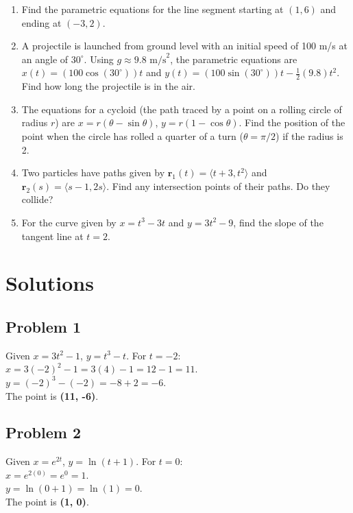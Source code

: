 \documentclass{article}
\begin{document}
\begin{enumerate}
    \item Find the parametric equations for the line segment starting at $(1, 6)$ and ending at $(-3, 2)$.
    \item A projectile is launched from ground level with an initial speed of 100 m/s at an angle of $30^\circ$. Using $g \approx 9.8 \text{ m/s}^2$, the parametric equations are $x(t) = (100\cos(30^\circ))t$ and $y(t) = (100\sin(30^\circ))t - \frac{1}{2}(9.8)t^2$. Find how long the projectile is in the air.
    \item The equations for a cycloid (the path traced by a point on a rolling circle of radius $r$) are $x = r(\theta - \sin\theta)$, $y = r(1-\cos\theta)$. Find the position of the point when the circle has rolled a quarter of a turn ($\theta = \pi/2$) if the radius is 2.

    \item Two particles have paths given by $\mathbf{r}_1(t) = \langle t+3, t^2 \rangle$ and $\mathbf{r}_2(s) = \langle s-1, 2s \rangle$. Find any intersection points of their paths. Do they collide?
    \item For the curve given by $x = t^3 - 3t$ and $y = 3t^2 - 9$, find the slope of the tangent line at $t=2$.
\end{enumerate}

\newpage
\section*{Solutions}

\subsection*{Problem 1}
Given $x = 3t^2 - 1$, $y = t^3 - t$. For $t = -2$: \\
$x = 3(-2)^2 - 1 = 3(4) - 1 = 12 - 1 = 11$. \\
$y = (-2)^3 - (-2) = -8 + 2 = -6$. \\
The point is \textbf{(11, -6)}.

\subsection*{Problem 2}
Given $x = e^{2t}$, $y = \ln(t+1)$. For $t = 0$: \\
$x = e^{2(0)} = e^0 = 1$. \\
$y = \ln(0+1) = \ln(1) = 0$. \\
The point is \textbf{(1, 0)}.
\end{document}
